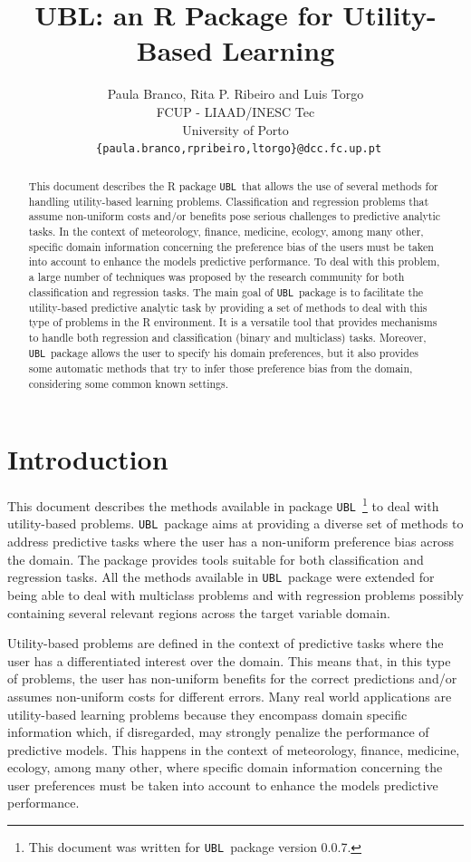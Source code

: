 \documentclass[10pt,a4paper]{article}\usepackage[]{graphicx}\usepackage[]{color}
\author{Paula Branco, Rita P. Ribeiro and Luis Torgo\\FCUP - LIAAD/INESC Tec\\University of Porto\\
  \texttt{ \{paula.branco,rpribeiro,ltorgo\}@dcc.fc.up.pt}}
\title{UBL: an R Package for Utility-Based Learning}
\newcommand{\pUBL}{package \texttt{UBL}\ }
\newcommand{\UBLp}{\texttt{UBL}\ package  }
\newcommand{\version}{0.0.7}
\begin{document}
\maketitle


\begin{abstract}
  
  This document describes the R \pUBL that allows the use of several methods for handling utility-based learning problems. Classification and regression problems that assume non-uniform costs and/or benefits pose serious challenges to predictive analytic tasks. In the context of meteorology, finance, medicine, ecology, among many other, specific domain information concerning the preference bias of the users must be taken into account to enhance the models predictive performance. To deal with this problem, a large number of techniques was proposed by the research community for both classification and regression tasks. 
  The main goal of \UBLp is to facilitate the utility-based predictive analytic task by providing a set of methods to deal with this type of problems in the R environment. It is a versatile tool that provides mechanisms to handle both regression and classification (binary and multiclass) tasks. Moreover, \UBLp allows the user to specify his domain preferences, but it also provides some automatic methods that try to infer those preference bias from the domain, considering some common known settings. 

\end{abstract}

\section{Introduction}

This document describes the methods available in \pUBL \footnote{This document was written for \UBLp version \version.} to deal with utility-based problems. \UBLp aims at providing a diverse set of methods to address predictive tasks where the user has a non-uniform preference bias across the domain. The package provides tools suitable for both classification and regression tasks. All the methods available in \UBLp were extended for being able to deal with multiclass problems and with regression problems possibly containing several relevant regions across the target variable domain. 


Utility-based problems are defined in the context of predictive tasks where the user has a differentiated interest over the domain. This means that, in this type of problems, the user has non-uniform benefits for the correct predictions and/or assumes non-uniform costs for different errors. Many real world applications are utility-based learning problems because they encompass domain specific information which, if disregarded, may strongly penalize the performance of predictive models. This happens in the context of meteorology, finance, medicine, ecology, among many other, where specific domain information concerning the user preferences must be taken into account to enhance the models predictive performance.
\end{document}
